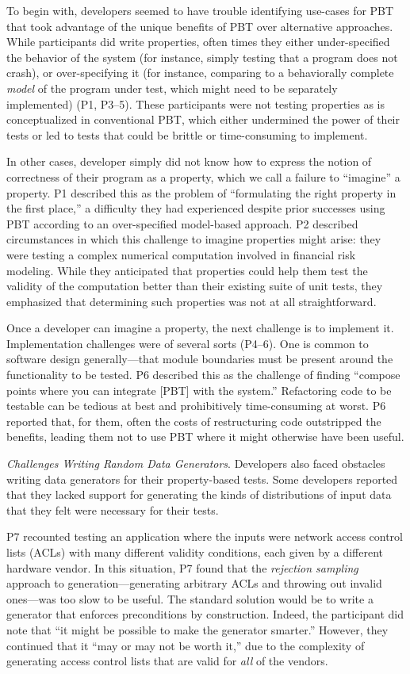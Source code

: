 To begin with, developers seemed to have trouble identifying use-cases for PBT
that took advantage of the unique benefits of PBT over alternative approaches. While participants
did write properties, often times they either under-specified the
behavior of the system (for instance, simply testing that a program does not crash),
or over-specifying it (for instance, comparing to a behaviorally complete
{\em model} of the program under test, which might need to be separately
implemented) (P1, P3--5).
These participants were not testing properties as is conceptualized
in conventional PBT, which either undermined the power of their tests or
led to tests that could be brittle or time-consuming to implement.

In other cases, developer simply did not know how to express the notion of
correctness of their program as a property, which we call a failure
to ``imagine'' a property.
P1 described this as the problem of ``formulating the right property in the first place,''
a difficulty they had experienced despite prior successes using PBT according to
an over-specified model-based approach. P2 described circumstances in which this
challenge to imagine properties might arise: they were testing a complex numerical
computation involved in financial risk modeling. While they anticipated that
properties could help them test the validity of the computation better than their
existing suite of unit tests, they emphasized that determining such properties
was not at all straightforward.

Once a developer can imagine a property, the next challenge is to implement it.
Implementation challenges were of several sorts (P4--6). One
is common to software design generally---that module boundaries must be present
around the functionality to be tested. P6 described this as the challenge of
finding ``compose points where you can integrate [PBT] with the system.'' Refactoring
code to be testable can be tedious at best and prohibitively time-consuming at
worst. P6 reported that, for them, often the costs of restructuring code outstripped the benefits,
leading them not to use PBT where it might otherwise have been useful.

\textit{Challenges Writing Random Data Generators}.
Developers also faced obstacles writing data generators for their property-based
tests.
Some developers reported that they lacked support for generating the kinds of
distributions of input data that they felt were necessary for their tests.

P7 recounted testing an application where the inputs were network access control lists (ACLs)
with many different validity conditions, each given by
a different hardware vendor.
In this situation, P7 found that the {\em rejection sampling} approach to generation---generating
arbitrary ACLs and throwing out invalid ones---was too slow to be useful.
The standard solution would be to write a generator that enforces preconditions
by construction. Indeed, the participant did note that ``it might be possible to
make the generator smarter.'' However, they continued that it ``may or may not be worth it,'' due to
the complexity of generating access control lists that are valid for \emph{all}
of the vendors.


